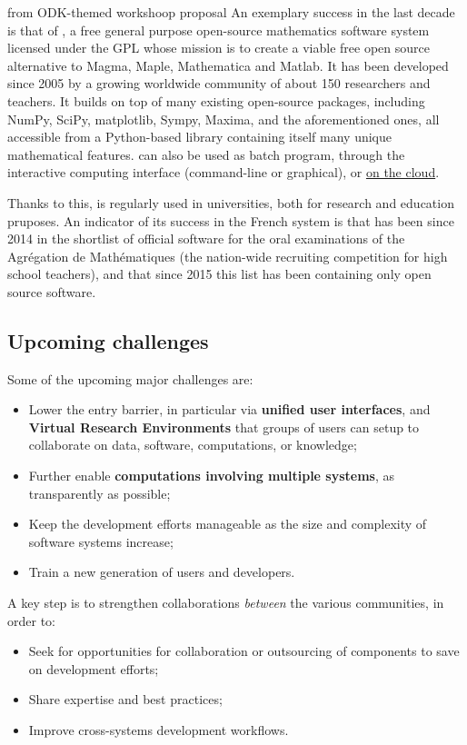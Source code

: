 \begin{oldpart}{from ODK-themed workshoop proposal}
An exemplary success in the last decade is that of \Sage,
a free general purpose open-source mathematics
software system licensed under the GPL whose mission is to create a
viable free open source alternative to Magma, Maple, Mathematica and
Matlab. It has been developed since 2005 by a growing worldwide community of
about 150 researchers and teachers. It builds on top of many existing
open-source packages, including NumPy, SciPy, matplotlib, Sympy,
Maxima, and the aforementioned ones, all accessible from a
Python-based library containing itself many unique mathematical
features. \Sage can also be used as batch program, through the
\Jupyter interactive computing interface (command-line or graphical),
or \href{cloud.sagemath.org}{on the cloud}.

Thanks to this, \Sage is regularly used in universities, both for
research and education pruposes.  An indicator of its success in the French
system is that \Sage has been since 2014 in the shortlist of official
software for the oral examinations of the Agrégation de Mathématiques
(the nation-wide recruiting competition for high school teachers), and
that since 2015 this list has been containing only open source software.

\subsection{Upcoming challenges}

Some of the upcoming major challenges are:
\begin{itemize}
\item Lower the entry barrier, in particular via \textbf{unified user
    interfaces}, and \textbf{Virtual Research Environments} that
  groups of users can setup to collaborate on data, software,
  computations, or knowledge;
\item Further enable \textbf{computations involving multiple systems},
  as transparently as possible;
\item Keep the development efforts manageable as the size and
  complexity of software systems increase;
\item Train a new generation of users and developers.
\end{itemize}

A key step is to strengthen collaborations \emph{between} the various
communities, in order to:
\begin{itemize}
\item Seek for opportunities for collaboration or outsourcing of
  components to save on development efforts;
\item Share expertise and best practices;
\item Improve cross-systems development workflows.
\end{itemize}


\end{oldpart}
